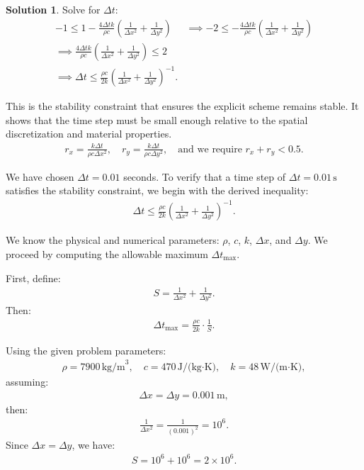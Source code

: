 \documentclass[12pt]{article}
\theoremstyle{definition} %
\newtheorem{solution}{Solution}
\theoremstyle{plain} %
\begin{document}
\begin{solution}
 Solve for $\Delta t$:
\begin{align}
-1 \leq 1 - \frac{4\Delta t k}{\rho c}\left( \frac{1}{\Delta x^2} + \frac{1}{\Delta y^2} \right) &\implies -2 \leq - \frac{4\Delta t k}{\rho c}\left( \frac{1}{\Delta x^2} + \frac{1}{\Delta y^2}\right) \\
\implies \frac{4 \Delta t k}{\rho c}\left( \frac{1}{\Delta x^2} + \frac{1}{\Delta y^2}\right) \leq 2 \\
\implies \Delta t \leq \frac{\rho c}{2k}\left(\frac{1}{\Delta x^2} + \frac{1}{\Delta y^2}\right)^{-1}.
\end{align}

 This is the stability constraint that ensures the explicit scheme remains stable. It shows that the time step must be small enough relative to the spatial discretization and material properties.
            \begin{align}
            r_x = \frac{k \Delta t}{\rho c \Delta x^2}, \quad r_y = \frac{k \Delta t}{\rho c \Delta y^2}, \quad \text{and we require } r_x + r_y < 0.5.
            \end{align}
        
             We have chosen $\Delta t = 0.01$ seconds. To verify that a time step of $\Delta t = 0.01\,\text{s}$ satisfies the stability constraint, we begin with the derived inequality:
            \begin{align}
            \Delta t \leq \frac{\rho c}{2k} \left( \frac{1}{\Delta x^2} + \frac{1}{\Delta y^2} \right)^{-1}.
            \end{align}
            
             We know the physical and numerical parameters: $\rho$, $c$, $k$, $\Delta x$, and $\Delta y$. We proceed by computing the allowable maximum $\Delta t_{\max}$.
            
            First, define:
            \begin{align}
            S = \frac{1}{\Delta x^2} + \frac{1}{\Delta y^2}.
            \end{align}
            Then:
            \begin{align}
            \Delta t_{\max} = \frac{\rho c}{2k}\cdot \frac{1}{S}.
            \end{align}
            
             Using the given problem parameters:
            \begin{align}
            \rho = 7900\,\text{kg/m}^3, \quad c = 470\,\text{J/(kg·K)}, \quad k = 48\,\text{W/(m·K)},
            \end{align}
            assuming:
            \begin{align}
            \Delta x = \Delta y = 0.001\,\text{m},
            \end{align}
            then:
            \begin{align}
            \frac{1}{\Delta x^2} = \frac{1}{(0.001)^2} = 10^6.
            \end{align}
            Since $\Delta x = \Delta y$, we have:
            \begin{align}
            S = 10^6 + 10^6 = 2 \times 10^6.
            \end{align}
            

\end{solution}
\end{document}
